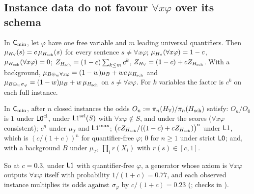 \subsection{Instance data do not favour \texorpdfstring{$\forall x\varphi$}{forall x phi} over its schema}\label{sec:univ:never}

\begin{proposition}[Factorisation]\label{prop:univ:factor}
In $\mathsf{C}_{\min}$, let $\varphi$ have one free variable and $m$ leading universal quantifiers. Then $\mu_{H_{\forall}}(s)=c\,\mu_{H_{\mathrm{sch}}}(s)$ for every sentence $s\neq\forall x\varphi$; $\mu_{H_{\forall}}(\forall x\varphi)=1-c$, $\mu_{H_{\mathrm{sch}}}(\forall x\varphi)=0$; $Z_{H_{\mathrm{sch}}}=(1-c)\sum_{k\le m}c^k$, $Z_{H_{\forall}}=(1-c)+cZ_{H_{\mathrm{sch}}}$. With a background, $\mu_{B\oplus_w\forall x\varphi}=(1-w)\mu_B+wc\,\mu_{H_{\mathrm{sch}}}$ and $\mu_{B\oplus_w\sigma_\varphi}=(1-w)\mu_B+w\,\mu_{H_{\mathrm{sch}}}$ on $s\neq\forall x\varphi$. For $k$ variables the factor is $c^k$ on each full instance.
\end{proposition}

\begin{theorem}\label{thm:univ:odds}
In $\mathsf{C}_{\min}$, after $n$ closed instances the odds $O_n:=\pi_n(H_{\forall})/\pi_n(H_{\mathrm{sch}})$ satisfy: $O_n/O_0$ is $1$ under $\mathord{\mathsf{L0}}^{\mathrm{cl}}$, under $\mathord{\mathsf{L1}}^{\mathrm{sel}}(S)$ with $\forall x\varphi\notin S$, and under the scores ($\forall x\varphi$ consistent); $c^n$ under $\mu_T$ and $\mathord{\mathsf{L1}}^{\max}$; $\big(cZ_{H_{\mathrm{sch}}}/((1-c)+cZ_{H_{\mathrm{sch}}})\big)^n$ under $\mathord{\mathsf{L1}}$, which is $(c/(1+c))^n$ for quantifier-free $\varphi$; $0$ for $n\ge1$ under strict $\mathord{\mathsf{L0}}$; and, with a background $B$ under $\mu_T$, $\prod_ir(X_i)$ with $r(s)\in[c,1]$.
\end{theorem}

So at $c=0.3$, under $\mathord{\mathsf{L1}}$ with quantifier-free $\varphi$, a generator whose axiom is $\forall x\varphi$ outputs $\forall x\varphi$ itself with probability $1/(1+c)=0.77$, and each observed instance multiplies its odds against $\sigma_\varphi$ by $c/(1+c)=0.23$ (; checks in ).

